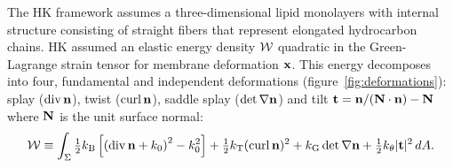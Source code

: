 
The HK framework assumes a three-dimensional lipid monolayers with internal structure
consisting of straight fibers that represent elongated hydrocarbon chains. HK assumed an
elastic energy density ${\cal W}$ quadratic in the Green-Lagrange strain tensor for membrane deformation ${\bf x}$.
%
%
%
%
%
This energy decomposes into four, fundamental and independent deformations  (figure~\ref{fig:deformations}):
splay ($\operatorname{div} {\bf n}$), twist ($\operatorname{curl} {\bf n}$), saddle splay ($\det \nabla {\bf n}$) and tilt ${\bf t}={\bf n}/({\bf N}\cdot {\bf n}) - {\bf N}$ where ${\bf N}$ is the unit surface normal:
\begin{equation}
\label{ansatz3}
\begin{aligned}
{\cal W} \equiv \int_{\Sigma} 
  \tfrac{1}{2}k_{\mathrm{B}}\left[ \left( \operatorname{div} {\bf n} + k_0\right)^2 - k_0^2\right] 
+ \tfrac{1}{2}k_{\mathrm{T}} (\operatorname{curl} {\bf n})^2 + k_{\mathrm{G}}  \det \nabla {\bf n} + \tfrac{1}{2}k_{\theta} |{\bf t}|^2 \,dA.
\end{aligned}
\end{equation}
